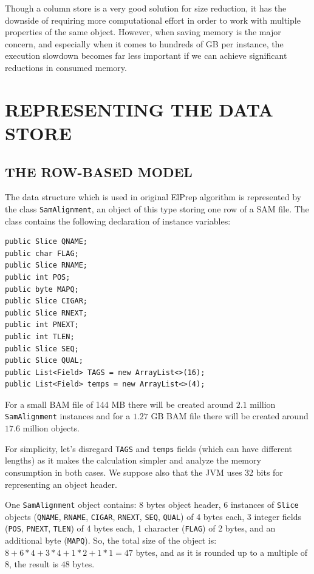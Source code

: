 \documentclass[a4paper,twoside]{article}
\begin{document}
Though a column store is a very good solution for size reduction, it has the downside of requiring more computational effort in order to work with multiple properties of the same object.
However, when saving memory is the major concern, and especially when it comes to hundreds of GB per instance, the execution slowdown becomes far less important if we can achieve significant reductions in consumed memory.



\section{\uppercase{Representing the Data Store}}

\subsection{\uppercase{The Row-Based Model}}

The data structure which is used in original ElPrep algorithm is represented by the class {\tt SamAlignment}, an object of this type storing one row of a SAM file.
The class contains the following declaration of instance variables:

\begin{small}
\begin{verbatim}
public Slice QNAME;
public char FLAG;
public Slice RNAME;
public int POS;
public byte MAPQ;
public Slice CIGAR;
public Slice RNEXT;
public int PNEXT;
public int TLEN;
public Slice SEQ;
public Slice QUAL;
public List<Field> TAGS = new ArrayList<>(16);
public List<Field> temps = new ArrayList<>(4);
\end{verbatim}
\end{small}

For a small BAM file of 144 MB there will be created around $2.1$ million {\tt SamAlignment} instances and for a $1.27$ GB BAM file there will be created around $17.6$ million objects.

For simplicity, let's disregard {\tt TAGS} and {\tt temps} fields (which can have different lengths) as it makes the calculation simpler and analyze the memory consumption in both cases.
We suppose also that the JVM uses 32 bits for representing an object header.

One {\tt SamAlignment} object contains:
8 bytes object header, 6 instances of {\tt Slice} objects ({\tt QNAME}, {\tt RNAME}, {\tt CIGAR}, {\tt RNEXT}, {\tt SEQ}, {\tt QUAL}) of 4 bytes each, 3 integer fields ({\tt POS}, {\tt PNEXT}, {\tt TLEN}) of 4 bytes each, 1 character ({\tt FLAG}) of 2 bytes, and an additional byte ({\tt MAPQ}).
So, the total size of the object is: $8 + 6 * 4 + 3*4  + 1 * 2+ 1 * 1 = 47$ bytes, and as it is rounded up to a multiple of $8$, the result is $48$ bytes.
\end{document}
